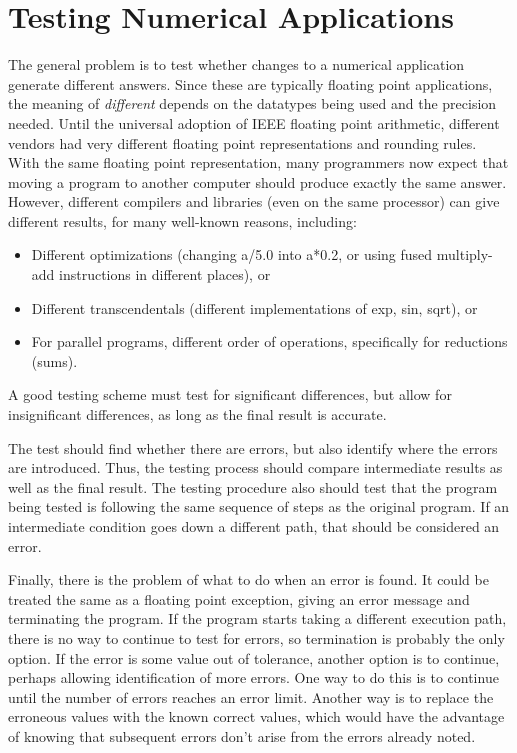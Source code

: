 \section{Testing Numerical Applications}

The general problem is to test whether changes to a numerical application generate different answers.
Since these are typically floating point applications, the meaning of \emph{different} depends on the datatypes being used and the precision needed.
Until the universal adoption of IEEE floating point arithmetic\cite{goldberg.cs.91}, different vendors had very different floating point representations and rounding rules.
With the same floating point representation, many programmers now expect that moving a program to another computer should produce exactly the same answer.
However, different compilers and libraries (even on the same processor) can give different results, for many well-known reasons, including:
\begin{itemize}
\item Different optimizations (changing a/5.0 into a*0.2, or using fused multiply-add instructions in different places), or
\item Different transcendentals (different implementations of exp, sin, sqrt), or
\item For parallel programs, different order of operations, specifically for reductions (sums).
\end{itemize}
A good testing scheme must test for significant differences, but allow for insignificant differences, as long as the final result is accurate.

The test should find whether there are errors, but also identify where the errors are introduced.
Thus, the testing process should compare intermediate results as well as the final result.
The testing procedure also should test that the program being tested is following the same sequence of steps as the original program.
If an intermediate condition goes down a different path, that should be considered an error.

Finally, there is the problem of what to do when an error is found.
It could be treated the same as a floating point exception, giving an error message and terminating the program.
If the program starts taking a different execution path, there is no way to continue to test for errors, so termination is probably the only option.
If the error is some value out of tolerance, another option is to continue, perhaps allowing identification of more errors.
One way to do this is to continue until the number of errors reaches an error limit.
Another way is to replace the erroneous values with the known correct values, which would have the advantage of knowing that subsequent errors don't arise from the errors already noted.

